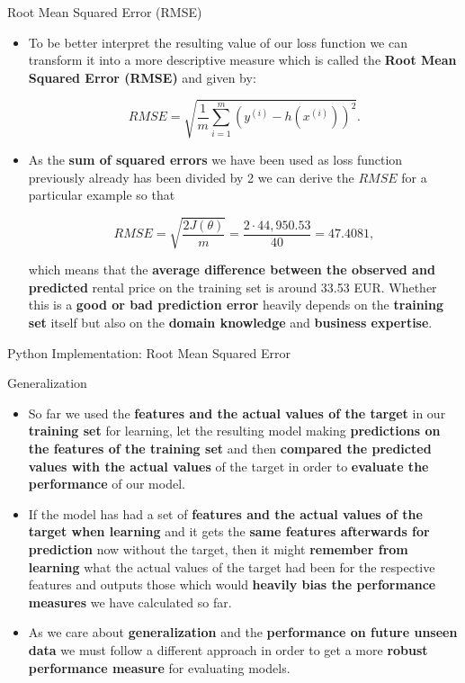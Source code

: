 \documentclass[main.tex]{subfiles}
\begin{document}
    \begin{frame}{Root Mean Squared Error (RMSE)}
        \begin{itemize}
            \item To be better interpret the resulting value of our loss function we can transform it into a more descriptive measure which is called the \textbf{Root Mean Squared Error (RMSE)} and given by:
            
            $$RMSE = \sqrt{\frac{1}{m} \sum_{i=1}^m (y^{(i)} - h(x^{(i)}))^2}.$$
            \item As the \textbf{sum of squared errors} we have been used as loss function previously already has been divided by 2 we can derive the $RMSE$ for a particular example so that 
            
            $$RMSE = \sqrt{\frac{2J(\theta)}{m}} = \frac{2 \cdot 44,950.53}{40} = 47.4081,$$
            
            which means that the \textbf{average difference between the observed and predicted} rental price on the training set is around 33.53 EUR. Whether this is a\textbf{ good or bad prediction error} heavily depends on the \textbf{training set} itself but also on the \textbf{domain knowledge} and \textbf{business expertise}. 
        \end{itemize}
    \end{frame}

    \begin{frame}{Python Implementation: Root Mean Squared Error}
        
    \end{frame}

    \begin{frame}{Generalization}
        \begin{itemize}
            \item So far we used the \textbf{features and the actual values of the target} in our \textbf{training set} for learning, let the resulting model making \textbf{predictions on the features of the training set} and then \textbf{compared the predicted values with the actual values} of the target in order to \textbf{evaluate the performance} of our model.
            \item If the model has had a set of \textbf{features and the actual values of the target when learning} and it gets the \textbf{same features afterwards for prediction} now without the target, then it might \textbf{remember from learning} what the actual values of the target had been for the respective features and outputs those which would \textbf{heavily bias the performance measures} we have calculated so far.
            \item As we care about \textbf{generalization} and the \textbf{performance on future unseen data} we must follow a different approach in order to get a more \textbf{robust performance measure} for evaluating models.
        \end{itemize}
    \end{frame}
\end{document}
